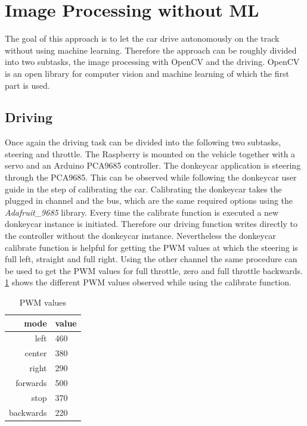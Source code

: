 \documentclass[conference]{IEEEtran}
\begin{document}
\section{Image Processing without ML}

The goal of this approach is to let the car drive autonomously on the track without using machine learning.
Therefore the approach can be roughly divided into two subtasks, the image processing with OpenCV and the driving.
OpenCV is an open library for computer vision and machine learning of which the first part is used.

\subsection{Driving}

Once again the driving task can be divided into the following two subtasks, steering and throttle.
The Raspberry is mounted on the vehicle together with a servo and an Arduino PCA9685 controller.
The donkeycar application is steering through the PCA9685.
This can be observed while following the donkeycar user guide in the step of calibrating the car.
Calibrating the donkeycar takes the plugged in channel and the bus, which are the same required options using the \textit{Adafruit\_9685} library.
Every time the calibrate function is executed a new donkeycar instance is initiated.
Therefore our driving function writes directly to the controller without the donkeycar instance.
Nevertheless the donkeycar calibrate function is helpful for getting the PWM values at which the steering is full left, straight and full right.
Using the other channel the same procedure can be used to get the PWM values for full throttle, zero and full throttle backwards.
\ref{tab:pwmval} shows the different PWM values observed while using the calibrate function.

\begin{table}[!t]
	\renewcommand{\arraystretch}{1.3}
	\caption{PWM values}
	\centering
	\begin{tabular}{r|l}
		mode&value\\
		\hline
		left & 460\\
		center & 380\\
		right & 290\\
		forwards & 500\\
		stop & 370\\
		backwards & 220\\
	\end{tabular}
	\label{tab:pwmval}
\end{table}
\end{document}
